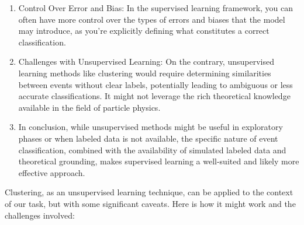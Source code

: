 \begin{enumerate}
      \item Control Over Error and Bias: In the supervised learning framework, you can often have more control over the
            types of errors and biases that the model may introduce, as you're explicitly defining what constitutes a
            correct classification.

      \item Challenges with Unsupervised Learning: On the contrary, unsupervised learning methods like clustering would
            require determining similarities between events without clear labels, potentially leading to ambiguous or less
            accurate classifications. It might not leverage the rich theoretical knowledge available in the field of
            particle physics.

      \item In conclusion, while unsupervised methods might be useful in exploratory phases or when labeled data is not
            available, the specific nature of \tth event classification, combined with the availability of simulated
            labeled data and theoretical grounding, makes supervised learning a well-suited and likely more effective
            approach.
\end{enumerate}

Clustering, as an unsupervised learning technique, can be applied to the context of our task, but with some significant
caveats. Here is how it might work and the challenges involved:

